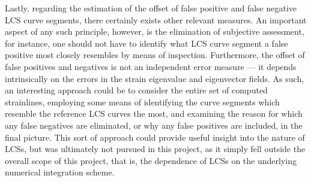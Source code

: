 Lastly, regarding the estimation of the offset of false positive and false
negative LCS curve segments, there certainly exists other relevant measures.
An important aspect of any such principle, however, is the elimination of
subjective assessment, for instance, one should not have to identify
what LCS curve segment a false positive most closely resembles by means of
inspection. Furthermore, the offset of false positives and negatives is not
an independent error measure --- it depends intrinsically on the errors
in the strain eigenvalue and eigenvector fields. As such, an interesting
approach could be to consider the entire set of computed strainlines, employing
some means of identifying the curve segments which resemble the reference
LCS curves the most, and examining the reason for which any false negatives
are eliminated, or why any false positives are included, in the final picture.
This sort of approach could provide useful insight into the nature of LCSs, but
was ultimately not pursued in this project, as it simply fell outside the
overall scope of this project, that is, the dependence of LCSs on the
underlying numerical integration scheme.


